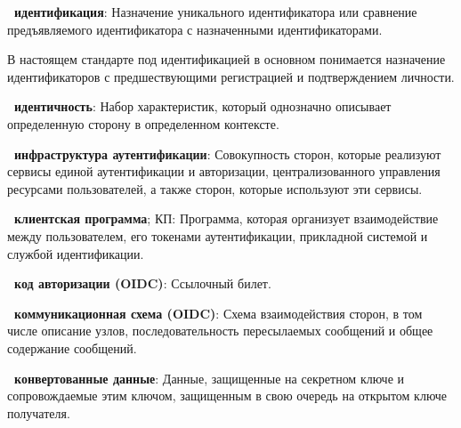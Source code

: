 {\bf \thedefctr~идентификация}: %
Назначение уникального идентификатора или сравнение предъявляемого 
идентификатора с назначенными идентификаторами.

\begin{note*}
В настоящем стандарте под идентификацией в основном понимается назначение
идентификаторов с предшествующими регистрацией и подтверждением личности.
\end{note*}

{\bf \thedefctr~идентичность}:
Набор характеристик, который однозначно описывает определенную сторону в 
определенном контексте.






{\bf \thedefctr~инфраструктура аутентификации}:
Совокупность сторон, которые реализуют сервисы единой аутентификации и 
авторизации, централизованного управления ресурсами пользователей,
а также сторон, которые используют эти сервисы.

{\bf \thedefctr~клиентская программа}; КП:
Программа, которая организует взаимодействие между пользователем,
его токенами аутентификации, прикладной системой и службой идентификации.


{\bf \thedefctr~код авторизации (OIDC)}:
Ссылочный билет.

{\bf \thedefctr~коммуникационная схема (OIDC)}:
Схема взаимодействия сторон, в том числе описание узлов,
последовательность пересылаемых сообщений и общее 
содержание сообщений.

{\bf \thedefctr~конвертованные данные}: %
Данные, защищенные на секретном ключе и сопровождаемые этим ключом, 
защищенным в свою очередь на открытом ключе получателя.

